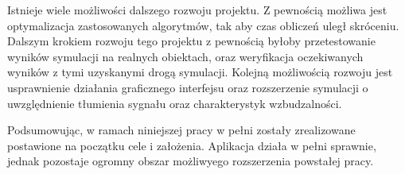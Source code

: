 Istnieje wiele możliwości dalszego rozwoju projektu. Z pewnością możliwa jest optymalizacja zastosowanych algorytmów, tak aby czas obliczeń uległ skróceniu. Dalszym krokiem rozwoju tego projektu z pewnością byłoby przetestowanie wyników symulacji na realnych obiektach, oraz weryfikacja oczekiwanych wyników z tymi uzyskanymi drogą symulacji. Kolejną możliwością rozwoju jest usprawnienie działania graficznego interfejsu oraz rozszerzenie symulacji o uwzględnienie tłumienia sygnału oraz charakterystyk wzbudzalności. 

Podsumowując, w ramach niniejszej pracy w pełni zostały zrealizowane postawione na początku cele i założenia. Aplikacja działa w pełni sprawnie, jednak pozostaje ogromny obszar możliwyego rozszerzenia powstałej pracy.